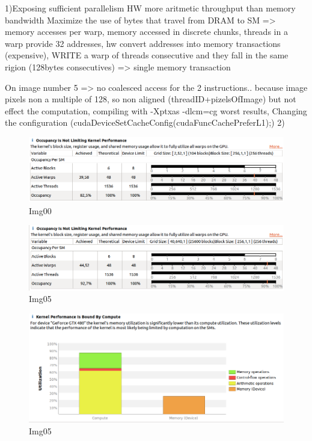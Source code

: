 \documentclass[a4paper]{article}
\begin{document}
1)Exposing sufficient parallelism
HW more aritmetic throughput than memory bandwidth
Maximize the use of bytes that travel from DRAM to SM => memory accesses per warp, memory accessed in discrete chunks, threads in a warp provide 32 addresses, hw convert addresses into memory transactions (expensive), 
WRITE
a warp of threads consecutive and they fall in the same rigion (128bytes consecutives) => single memory transaction

On image number 5 => no coalesced access for the 2 instructions.. because image pixels non a multiple of 128, so non aligned (threadID+pizelsOfImage) but not effect the computation, compiling with -Xptxas -dlcm=cg worst results, Changing the configuration (cudaDeviceSetCacheConfig(cudaFuncCachePreferL1);)
2) 

\begin{figure}[ht]
    \centering
    \includegraphics[width=0.7\linewidth]{profiling/darker/darker_occupancy_00}
    \caption{Img00}
    \label{fig:histo}
\end{figure}
\FloatBarrier

\begin{figure}[ht]
    \centering
    \includegraphics[width=0.7\linewidth]{profiling/darker/darker_06_occupancy}
    \caption{Img05}
    \label{fig:histo}
\end{figure}
\FloatBarrier

\begin{figure}[ht]
    \centering
    \includegraphics[width=0.7\linewidth]{profiling/darker/darker_utilization_00}
    \caption{Img05}
    \label{fig:histo}
\end{figure}
\FloatBarrier
\end{document}
